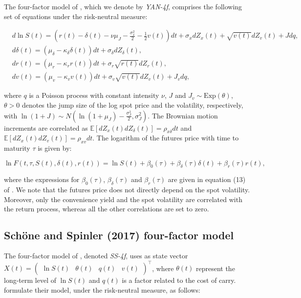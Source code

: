 \documentclass{article}
\begin{document}
The four-factor model of \cite{yan02}, which we denote by \textit{YAN-4f}, comprises the following set of equations under the risk-neutral measure:

\begin{align*}
    &d \ln S(t) =  \left(r(t) - \delta(t) - \nu \mu_J - \frac{\sigma_x^2}{2} - \frac{1}{2} v(t) \right)dt + \sigma_x dZ_{x}(t) + \sqrt{v(t)} dZ_{v}(t) + J dq, \\
    &d\delta(t) =  \left(\mu_\delta - \kappa_\delta \delta(t) \right)dt + \sigma_\delta dZ_{\delta}(t), \\ 
    &dr(t) = \left(\mu_r - \kappa_r r(t) \right) dt + \sigma_r \sqrt{r(t)} dZ_{r}(t), \\
    &dv(t) = \left(\mu_v - \kappa_v v(t) \right) dt + \sigma_v \sqrt{v(t)} dZ_{v}(t) + J_v dq,
\end{align*}

\noindent where \(q\) is a Poisson process with constant intensity \(\nu\), \(J\) and \(J_v \sim \text{Exp}(\theta)\), \(\theta > 0\) denotes the jump size of the log spot price and the volatility, respectively, with \(\ln{(1+J)} \sim N\left(\ln{(1+\mu_J)} - \frac{\sigma_J^2}{2}, \sigma_J^2 \right)\). The Brownian motion increments are correlated as 
$ \mathbb{E}[dZ_{x}(t) dZ_{\delta}(t)] = \rho_{x\delta} dt$ and $ \mathbb{E}[dZ_{x}(t) dZ_{v}(t)] = \rho_{xv} dt$. The logarithm of the futures price with time to maturity $\tau$ is given by:

\begin{equation*}
    \ln{F(t, \tau, S(t), \delta(t), r(t))} = \ln{S(t)} + \beta_0(\tau) + \beta_\delta(\tau) \delta(t) +
    \beta_r(\tau)r(t),
\end{equation*}

\noindent where the expressions for $\beta_0(\tau)$, $\beta_\delta(\tau)$ and $\beta_r(\tau)$ are given in equation (13) of \cite{yan02}. We note that the futures price does not directly depend on the spot volatility. Moreover, only the convenience yield and the spot volatility are correlated with the return process, whereas all the other correlations are set to zero.

\subsection{ Schöne and Spinler (2017) four-factor model} \label{sec_shone}

The four-factor model of \cite{spinler17}, denoted \textit{SS-4f}, uses as state vector ${X}(t) = \begin{pmatrix}
    \ln S(t) & \theta(t) & q(t) & v(t)
\end{pmatrix}^\top$, where $\theta(t)$ represent the long-term level of $\ln S(t)$ and $q(t)$ is a factor related to the cost of carry. \cite{spinler17} formulate their model, under the risk-neutral measure, as follows:
\end{document}
